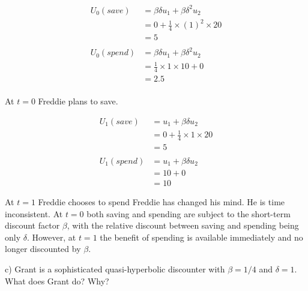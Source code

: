 \documentclass[
  letterpaper,
  DIV=11,
  numbers=noendperiod]{scrreprt}
\begin{document}
\begin{tcolorbox}[enhanced jigsaw, title=\textcolor{quarto-callout-tip-color}{\faLightbulb}\hspace{0.5em}{Answer}, toprule=.15mm, colback=white, breakable, titlerule=0mm, colframe=quarto-callout-tip-color-frame, coltitle=black, opacityback=0, rightrule=.15mm, colbacktitle=quarto-callout-tip-color!10!white, bottomtitle=1mm, opacitybacktitle=0.6, arc=.35mm, bottomrule=.15mm, toptitle=1mm, leftrule=.75mm, left=2mm]

\begin{align*}
U_0(save)&=\beta\delta u_1+\beta\delta^2 u_2 \\
&=0+\frac{1}{4}\times (1)^2\times 20 \\
&=5 \\
\\
U_0(spend)&=\beta\delta u_1+\beta\delta^2 u_2 \\
&=\frac{1}{4}\times 1\times 10+0 \\
&=2.5 \\
\end{align*}

At \(t=0\) Freddie plans to save.

\begin{align*}
U_1(save)&=u_1+\beta\delta u_2 \\
&=0+\frac{1}{4}\times 1\times 20 \\
&=5 \\
\\
U_1(spend)&=u_1+\beta\delta u_2 \\
&=10+0 \\
&=10
\end{align*}

At \(t=1\) Freddie chooses to spend Freddie has changed his mind. He is
time inconsistent. At \(t=0\) both saving and spending are subject to
the short-term discount factor \(\beta\), with the relative discount
between saving and spending being only \(\delta\). However, at \(t=1\)
the benefit of spending is available immediately and no longer
discounted by \(\beta\).

\end{tcolorbox}

c) Grant is a sophisticated quasi-hyperbolic discounter with
\(\beta=1/4\) and \(\delta=1\). What does Grant do? Why?
\end{document}
